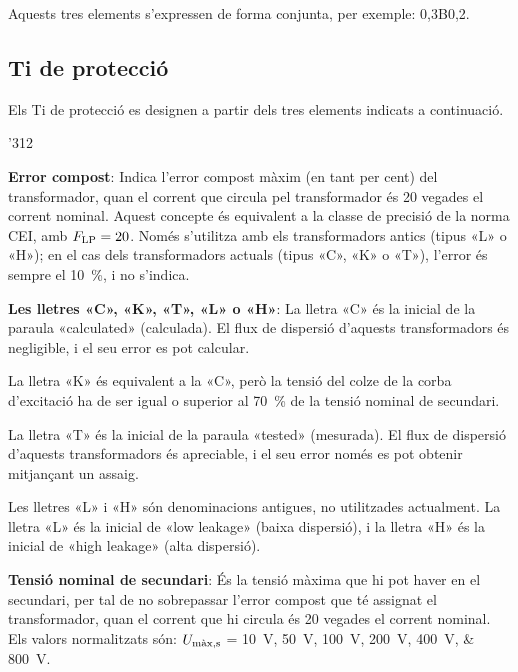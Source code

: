 Aquests tres elements s'expressen de forma conjunta, per exemple:
0,3B0,2.

\subsection{Ti de protecció}

Els Ti de protecció es designen a
partir dels tres elements indicats a continuació.

\begin{dingautolist}{'312}
    \item \textbf{Error compost}: Indica l'error compost màxim (en tant per cent) del
    transformador, quan el corrent que circula pel
    transformador és 20 vegades el corrent nominal. Aquest concepte
     és equivalent a la classe de precisió de la norma CEI,
     amb $F_\mathrm{LP}=20$. Només s'utilitza amb els transformadors antics (tipus «L» o «H»); en el cas dels transformadors actuals
     (tipus «C», «K» o «T»), l'error és sempre el \SI{10}{\percent}, i no s'indica.

    \item \textbf{Les lletres «C», «K», «T», «L» o «H»}: La lletra «C» és la inicial de la
    paraula  «calculated» (calculada). El flux de dispersió d'aquests transformadors és negligible, i el seu error es pot calcular.

    La lletra «K» és equivalent a la «C», però la tensió del colze de la corba d'excitació ha de ser igual o superior al \SI{70}{\percent}
    de la tensió nominal de secundari.

    La lletra «T» és la inicial de la   paraula  «tested» (mesurada). El flux de dispersió d'aquests transformadors és apreciable, i el seu error només es pot obtenir mitjançant un assaig.

    Les lletres «L» i «H» són denominacions antigues,  no utilitzades actualment. La lletra «L» és la inicial de «low leakage» (baixa
    dispersió), i la lletra «H» és la inicial de «high leakage» (alta dispersió).

    \item \textbf{Tensió nominal de secundari}: És la tensió màxima
    que hi pot haver en el secundari, per tal de no sobrepassar l'error compost que té
    assignat el transformador, quan el corrent que hi circula
     és 20 vegades el corrent nominal. Els valors
    normalitzats són: $U_\mathrm{m\grave{a}x,s}$ = \SIlist{10; 50; 100; 200; 400; 800}{V}.


\end{dingautolist}

